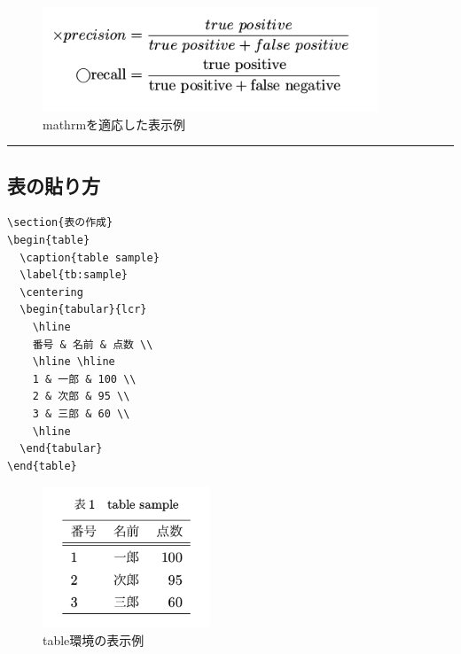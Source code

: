\begin{figure}[htbp]
\centering
\includegraphics[width=10.00000cm]{./figures/mathrm.png}
\caption{mathrmを適応した表示例}
\end{figure}

\begin{center}\rule{0.5\linewidth}{\linethickness}\end{center}

\hypertarget{ux8868ux306eux8cbcux308aux65b9}{\subsection{表の貼り方}\label{ux8868ux306eux8cbcux308aux65b9}}

\begin{lstlisting}
\section{表の作成}
\begin{table}
  \caption{table sample}
  \label{tb:sample}
  \centering
  \begin{tabular}{lcr}
    \hline
    番号 & 名前 & 点数 \\
    \hline \hline
    1 & 一郎 & 100 \\
    2 & 次郎 & 95 \\
    3 & 三郎 & 60 \\
    \hline
  \end{tabular}
\end{table}
\end{lstlisting}

\begin{figure}[htbp]
\centering
\includegraphics[width=5.00000cm]{./figures/table.png}
\caption{table環境の表示例}
\end{figure}

